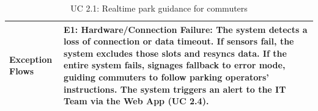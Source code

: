 \begin{table}[H]
\begin{tabularx}{\textwidth}{|>{\raggedright\arraybackslash}p{3.5cm}|>{\RaggedRight\arraybackslash}X|}
\hline
Exception Flows & 
\textbf{E1: Hardware/Connection Failure:} The system detects a loss of connection or data timeout. If sensors fail, the system excludes those slots and resyncs data. If the entire system fails, signages fallback to error mode, guiding commuters to follow parking operators' instructions. The system triggers an alert to the IT Team via the Web App (UC 2.4). \\
\hline
\end{tabularx}
\caption{UC 2.1: Realtime park guidance for commuters}
\label{tab:uc2.1}
\end{table}